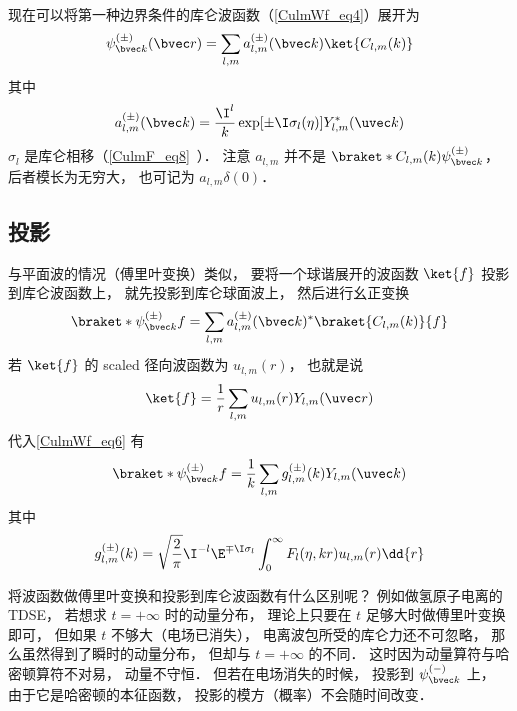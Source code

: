 现在可以将第一种边界条件的库仑波函数（\autoref{CulmWf_eq4}）展开为
\begin{equation}\label{CulmWf_eq9}
\psi_{\bvec k}^{(\pm)}(\bvec r) =  \sum_{l,m} a_{l,m}^{(\pm)}(\bvec k) \ket{C_{l,m}(k)}
\end{equation}
其中
\begin{equation}
a_{l,m}^{(\pm)}(\bvec k) = \frac{\I^l}{k} \exp[\pm\I\sigma_l(\eta)] Y_{l,m}^* (\uvec k)
\end{equation}
$\sigma_l$ 是库仑相移（\autoref{CulmF_eq8}~）． 注意 $a_{l,m}$ 并不是 $\braket*{C_{l,m}(k)}{\psi_{\bvec k}^{(\pm)}}$， 后者模长为无穷大， 也可记为 $a_{l,m}\delta(0)$．

\subsection{投影}
与平面波的情况（傅里叶变换）类似， 要将一个球谐展开的波函数 $\ket{f}$ 投影到库仑波函数上， 就先投影到库仑球面波上， 然后进行幺正变换
\begin{equation}\label{CulmWf_eq6}
\braket*{\psi_{\bvec k}^{(\pm)}}{f} = \sum_{l,m}  a_{l,m}^{(\pm)}(\bvec k)^* \braket{C_{l,m}(k)}{f}
\end{equation}
若 $\ket{f}$ 的 scaled 径向波函数为 $u_{l,m}(r)$， 也就是说
\begin{equation}
\ket{f} = \frac{1}{r}\sum_{l,m}u_{l,m}(r) Y_{l,m}(\uvec r)
\end{equation}
代入\autoref{CulmWf_eq6} 有
\begin{equation}\label{CulmWf_eq3}
\braket*{\psi_{\bvec k}^{(\pm)}}{f} = \frac{1}{k} \sum_{l,m} g_{l,m}^{(\pm)}(k) Y_{l,m}(\uvec k)
\end{equation}
其中
\begin{equation}\label{CulmWf_eq8}
g_{l,m}^{(\pm)}(k) = \sqrt{\frac{2}{\pi}} \I^{-l} \E^{\mp\I\sigma_l} \int_0^\infty F_l(\eta, kr) u_{l,m}(r) \dd{r}
\end{equation}

将波函数做傅里叶变换和投影到库仑波函数有什么区别呢？ 例如做氢原子电离的 TDSE， 若想求 $t = +\infty$ 时的动量分布， 理论上只要在 $t$ 足够大时做傅里叶变换即可， 但如果 $t$ 不够大（电场已消失）， 电离波包所受的库仑力还不可忽略， 那么虽然得到了瞬时的动量分布， 但却与 $t = +\infty$ 的不同． 这时因为动量算符与哈密顿算符不对易， 动量不守恒． 但若在电场消失的时候， 投影到 $\psi_{\bvec k}^{(-)}$ 上， 由于它是哈密顿的本征函数， 投影的模方（概率）不会随时间改变．

